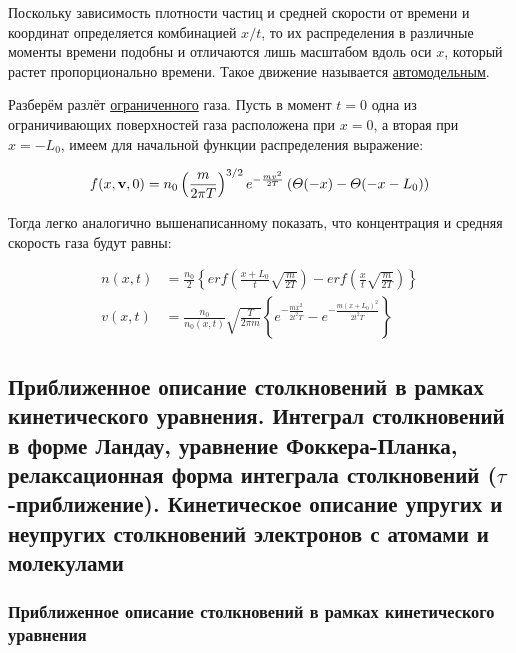 \documentclass[10pt, a4paper]{article}
\begin{document}
Поскольку зависимость плотности частиц и средней скорости от времени и координат определяется комбинацией $x/t$, то их распределения в различные моменты времени подобны и отличаются лишь масштабом вдоль оси $x$, который растет пропорционально времени. Такое движение называется \uline{автомодельным}.

Разберём разлёт \uline{ограниченного} газа. Пусть в момент $t=0$ одна из ограничивающих поверхностей газа расположена при $x=0$, а вторая при $x=-L_0$, имеем для начальной функции распределения выражение:

\begin{equation*}
	f(x,\vb{v}, 0) = n_0\left(\frac{m}{2\pi T}\right)^{3/2}e^{-\frac{mv^2}{2T}}\left(\varTheta(-x)-\varTheta(-x-L_0)\right)
\end{equation*}

Тогда легко аналогично вышенаписанному показать, что концентрация и средняя скорость газа будут равны:

\begin{align*}
	n(x, t) &= \frac{n_0}{2}\left\lbrace erf\left(\frac{x+L_0}{t}\sqrt{\frac{m}{2T}}\right) - erf\left(\frac{x}{t}\sqrt{\frac{m}{2T}}\right) \right\rbrace \\
	v(x, t) &= \frac{n_0}{n_0(x, t)}\sqrt{\frac{T}{2\pi m}}\left\lbrace e^{-\frac{mx^2}{2t^2T}} - e^{-\frac{m(x+L_0)^2}{2t^2T}}\right\rbrace 
\end{align*}

\subsection[Приближенное описание столкновений в рамках кинетического уравнения. Интеграл столкновений в форме Ландау, уравнение Фоккера-Планка, релаксационная форма интеграла 	столкновений ($\tau$-приближение). Кинетическое описание упругих и неупругих столкновений электронов с атомами и молекулами. Приближенное описание кинетики электронов в слабом однородном электрическом поле (расчет эффективной частоты столкновений и нагрева электронов). Явление убегающих электронов]{Приближенное описание столкновений в рамках кинетического уравнения. Интеграл столкновений в форме Ландау, уравнение Фоккера-Планка, релаксационная форма интеграла 	столкновений \linebreak ($\tau$-приближение). Кинетическое описание упругих и неупругих столкновений электронов с атомами и молекулами} \label{subsec:collision_terms}

\subsubsection{Приближенное описание столкновений в рамках кинетического уравнения}
\end{document}
